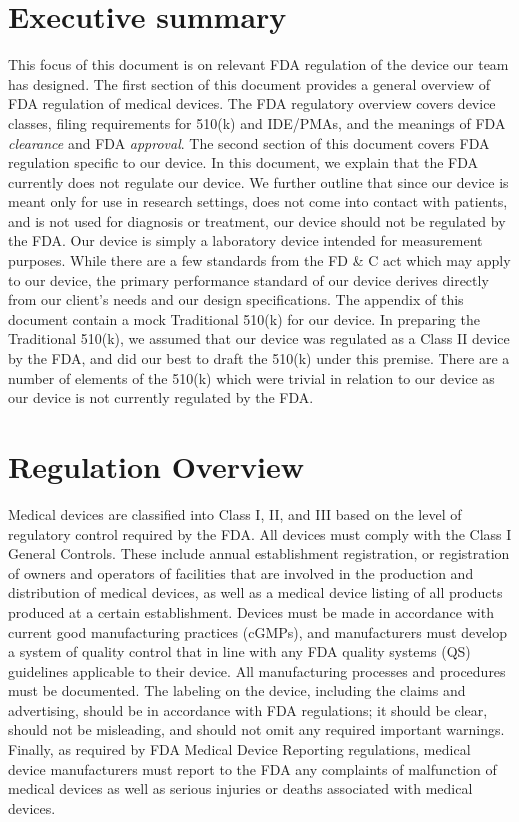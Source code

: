 \documentclass{article}
\begin{document}

\setcounter{tocdepth}{3}
\tableofcontents
\newpage

\section*{Executive summary}
\label{sec:exec-summary}
This focus of this document is on relevant FDA regulation of the
device our team has designed. The first section of this document
provides a general overview of FDA regulation of medical devices. The
FDA regulatory overview covers device classes, filing requirements for
510(k) and IDE/PMAs, and the meanings of FDA \textit{clearance} and
FDA \textit{approval}. The second section of this document covers FDA
regulation specific to our device. In this document, we explain that
the FDA currently does not regulate our device. We further outline
that since our device is meant only for use in research settings, does
not come into contact with patients, and is not used for diagnosis or
treatment, our device should not be regulated by the FDA. Our device
is simply a laboratory device intended for measurement purposes. While
there are a few standards from the FD \& C act which may apply to our
device, the primary performance standard of our device derives
directly from our client's needs and our design specifications. The
appendix of this document contain a mock Traditional 510(k) for our
device. In preparing the Traditional 510(k), we assumed that our
device was regulated as a Class II device by the FDA, and did our best
to draft the 510(k) under this premise. There are a number of elements
of the 510(k) which were trivial in relation to our device as our
device is not currently regulated by the FDA. 

\section{Regulation Overview}
\label{sec:test-administration}

Medical devices are classified into Class I, II, and III based on the
level of regulatory control required by the FDA. All devices must
comply with the Class I General Controls. These include annual
establishment registration, or registration of owners and operators of
facilities that are involved in the production and distribution of
medical devices, as well as a medical device listing of all products
produced at a certain establishment. Devices must be made in
accordance with current good manufacturing practices (cGMPs), and
manufacturers must develop a system of quality control that in line
with any FDA quality systems (QS) guidelines applicable to their
device. All manufacturing processes and procedures must be
documented. The labeling on the device, including the claims and
advertising, should be in accordance with FDA regulations; it should
be clear, should not be misleading, and should not omit any required
important warnings. Finally, as required by FDA Medical Device
Reporting regulations, medical device manufacturers must report to the
FDA any complaints of malfunction of medical devices as well as
serious injuries or deaths associated with medical devices.
\end{document}
